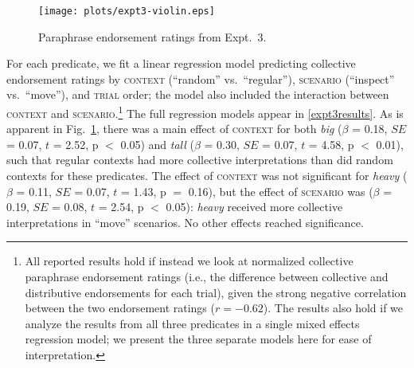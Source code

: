 \documentclass[preprint,12pt,authoryear,titlepage]{elsarticle}
\newcommand{\ndg}[1]{\textcolor{Green}{[ndg: #1]}}
\begin{document}

\begin{figure}[h!]
	\centering
	\texttt{[image: plots/expt3-violin.eps]} 
	\vspace{-20pt}
	\caption{Paraphrase endorsement ratings from Expt.~3.}\label{resultsexpt2}
\end{figure}

For each predicate, we fit a linear regression model predicting collective endorsement ratings by \textsc{context} (``random'' vs.~``regular''),
\textsc{scenario} (``inspect'' vs.~``move''), and \textsc{trial} order; the model also included the interaction between \textsc{context} and \textsc{scenario}.\footnote{All reported results hold if instead we look at normalized collective paraphrase endorsement ratings (i.e., the difference between collective and distributive endorsements for each trial), given the strong negative correlation between the two endorsement ratings ($r=-0.62$). The results also hold if we analyze the results from all three predicates in a single mixed effects regression model; we present the three separate models here for ease of interpretation.} The full regression models appear in \ref{expt3results}.
As is apparent in Fig.~\ref{resultsexpt2}, there was a main effect of \textsc{context} for both \emph{big} ($\beta$ = 0.18, $SE$ = 0.07, $t$ = 2.52, p $<$ 0.05) and \emph{tall} ($\beta$ = 0.30, $SE$ = 0.07, $t$ = 4.58, p $<$ 0.01), such that regular contexts had more collective interpretations than did random contexts for these predicates. The effect of \textsc{context} was not significant for \emph{heavy} ($\beta$ = 0.11, $SE$ = 0.07, $t$ = 1.43, p $=$ 0.16), but the effect of \textsc{scenario} was ($\beta$ = 0.19, $SE$ = 0.08, $t$ = 2.54, p $<$ 0.05): \emph{heavy} received more collective interpretations in ``move'' scenarios. No other effects reached significance.

\end{document}
